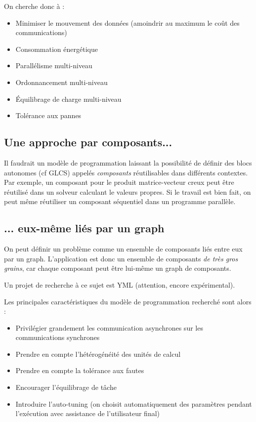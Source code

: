 \documentclass{article}
\begin{document}
On cherche donc à :
\begin{itemize}
\item Minimiser le mouvement des données (amoindrir au maximum le coût des communications)
\item Consommation énergétique
\item Parallélisme multi-niveau
\item Ordonnancement multi-niveau
\item Équilibrage de charge multi-niveau
\item Tolérance aux pannes
\end{itemize}


\subsection{Une approche par composants...}
Il faudrait un modèle de programmation laissant la possibilité de définir des blocs autonomes (cf GLCS) appelés \emph{composants} réutilisables dans différents contextes. Par exemple, un composant pour le produit matrice-vecteur creux peut être réutilisé dans un solveur calculant le valeurs propres. Si le travail est bien fait, on peut même réutiliser un composant séquentiel dans un programme parallèle.

\subsection{... eux-même liés par un graph}
On peut définir un problème comme un ensemble de composants liés entre eux par un graph. L'application est donc un ensemble de composants \emph{de très gros grains}, car chaque composant peut être lui-même un graph de composants.

\bigskip
Un projet de recherche à ce sujet est YML (attention, encore expérimental).

\bigskip
Les principales caractéristiques du modèle de programmation recherché sont alors :
\begin{itemize}
\item Privilégier grandement les communication asynchrones sur les communications synchrones
\item Prendre en compte l'hétérogénéité des unités de calcul
\item Prendre en compte la tolérance aux fautes
\item Encourager l'équilibrage de tâche
\item Introduire l'auto-tuning (on choisit automatiquement des paramètres pendant l'exécution avec assistance de l'utilisateur final)
\end{itemize}
\end{document}
